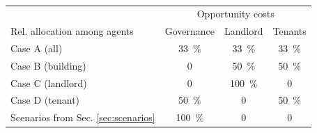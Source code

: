 \begin{table}[h]
	\centering
		\renewcommand{\arraystretch}{1.35}
		\begin{tabular}{lccc}
			\toprule
			& \multicolumn{3}{c}{Opportunity costs}\\
			\cmidrule(lr){2-4}
			Rel. allocation among agents& Governance & Landlord & Tenants\\
			\hline
			Case A (all) & \SI{33}{\%} & \SI{33}{\%} & \SI{33}{\%}\\
			Case B (building) & 0 & \SI{50}{\%} & \SI{50}{\%}\\
			Case C (landlord) & 0 & \SI{100}{\%} & 0\\
			Case D (tenant) & \SI{50}{\%} & 0 & \SI{50}{\%}\\
			\hline
			\cellcolor{Gray}Scenarios from Sec. \ref{sec:scenarios} & \cellcolor{Gray}\SI{100}{\%} & \cellcolor{Gray}0 & \cellcolor{Gray}0\\
			\bottomrule
	\end{tabular}
	\caption{}
	\label{tab:allocation}
\end{table}

